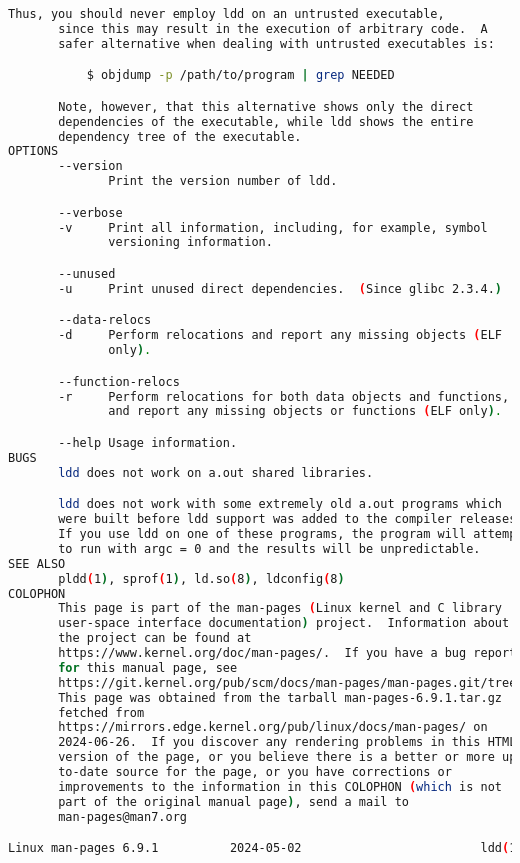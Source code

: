 {{\begin{lstlisting}[language=bash]
       Thus, you should never employ ldd on an untrusted executable,
       since this may result in the execution of arbitrary code.  A
       safer alternative when dealing with untrusted executables is:

           $ objdump -p /path/to/program | grep NEEDED

       Note, however, that this alternative shows only the direct
       dependencies of the executable, while ldd shows the entire
       dependency tree of the executable.
OPTIONS
       --version
              Print the version number of ldd.

       --verbose
       -v     Print all information, including, for example, symbol
              versioning information.

       --unused
       -u     Print unused direct dependencies.  (Since glibc 2.3.4.)

       --data-relocs
       -d     Perform relocations and report any missing objects (ELF
              only).

       --function-relocs
       -r     Perform relocations for both data objects and functions,
              and report any missing objects or functions (ELF only).

       --help Usage information.
BUGS
       ldd does not work on a.out shared libraries.

       ldd does not work with some extremely old a.out programs which
       were built before ldd support was added to the compiler releases.
       If you use ldd on one of these programs, the program will attempt
       to run with argc = 0 and the results will be unpredictable.
SEE ALSO
       pldd(1), sprof(1), ld.so(8), ldconfig(8)
COLOPHON
       This page is part of the man-pages (Linux kernel and C library
       user-space interface documentation) project.  Information about
       the project can be found at 
       https://www.kernel.org/doc/man-pages/.  If you have a bug report
       for this manual page, see
       https://git.kernel.org/pub/scm/docs/man-pages/man-pages.git/tree/CONTRIBUTING.
       This page was obtained from the tarball man-pages-6.9.1.tar.gz
       fetched from
       https://mirrors.edge.kernel.org/pub/linux/docs/man-pages/ on
       2024-06-26.  If you discover any rendering problems in this HTML
       version of the page, or you believe there is a better or more up-
       to-date source for the page, or you have corrections or
       improvements to the information in this COLOPHON (which is not
       part of the original manual page), send a mail to
       man-pages@man7.org

Linux man-pages 6.9.1          2024-05-02                         ldd(1)
\end{lstlisting}
}}
\endinput  %
